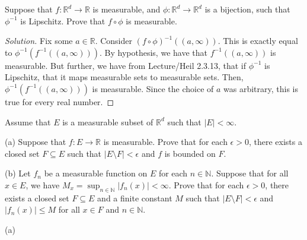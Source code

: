 \documentclass[10pt]{article}
\newenvironment{problem}[2][Problem]{\begin{trivlist}
\item[\hskip \labelsep {\bfseries #1}\hskip \labelsep {\bfseries #2.}]}{\end{trivlist}}
\begin{document}
\begin{problem}{3.2.20}

Suppose that $f: \mathbb{R}^d \to \mathbb{R}$ is measurable, and $\phi: \mathbb{R}^d \to \mathbb{R}^d$ is a bijection, such that $\phi^{-1}$ is Lipschitz. Prove that $f \circ \phi$ is measurable.
\end{problem}
\begin{proof}[Solution]

Fix some $a \in \mathbb{R}$. Consider $(f \circ \phi)^{-1}( (a,\infty))$. This is exactly equal to $\phi^{-1}(f^{-1} ((a,\infty)))$. By hypothesis, we have that $f^{-1} ((a,\infty))$ is measurable. But further, we have from Lecture/Heil 2.3.13, that if $\phi^{-1}$ is Lipschitz, that it maps measurable sets to measurable sets. Then, $\phi^{-1}(f^{-1} ((a,\infty)))$ is measurable. Since the choice of $a$ was arbitrary, this is true for every real number. 

\end{proof}

\begin{problem}{3.2.21}
Assume that $E$ is a measurable subset of $\mathbb{R}^d$ such that $|E| < \infty$.

(a) Suppose that $f: E \to \mathbb{R}$ is measurable. Prove that for each $\epsilon > 0$, there exists a closed set $F \subseteq E$ such that $|E \setminus F| < \epsilon $ and $f$ is bounded on $F$.

(b) Let $f_n$ be a measurable function on $E$ for each $n \in \mathbb{N}$. Suppose that for all $x \in E$, we have $M_x = \sup_{n \in \mathbb{N}} |f_n(x)| < \infty$. Prove that for each $\epsilon > 0$, there exists a closed set $F \subseteq E$ and a finite constant $M$ such that $|E \setminus F| < \epsilon$ and $|f_n(x)| \leq M$ for all $x \in F$ and $n \in \mathbb{N}$. 
\end{problem}

(a)
\end{document}
